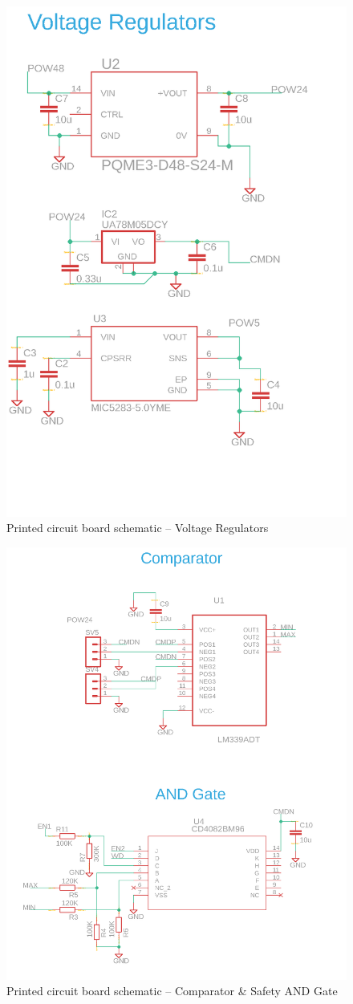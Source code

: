 \documentclass[12pt]{report}
\begin{document}
		
	\begin{figure}[h] 
		\centering
		\includegraphics[width=0.75\linewidth]{pcb_schematic01_1}
		\caption{Printed circuit board schematic -- Voltage Regulators}
		\label{fig:pcb}
	\end{figure}
	
	\begin{figure}[h] 
		\centering
		\includegraphics[width=0.8\linewidth]{pcb_schematic01_2}
		\caption{Printed circuit board schematic -- Comparator \& Safety AND Gate}
		\label{fig:pcb}
	\end{figure}
	
\end{document}
